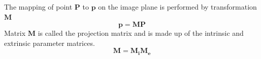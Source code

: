 The mapping of point $\pmb{P}$ to $\pmb{p}$ on the image plane is performed by transformation $\pmb{M}$
\[
    \pmb{p} = \pmb{M P}
\]
Matrix $\pmb{M}$ is called the projection matrix and is made up of the intrinsic and extrinsic parameter matrices.
\[
    \pmb{M} = \pmb{M_i M_e}
\]
